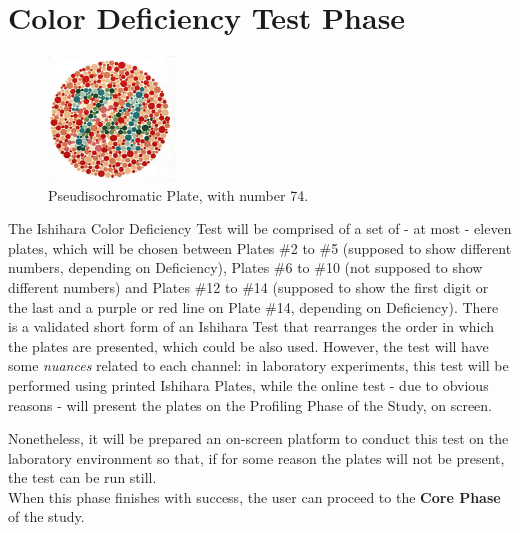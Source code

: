 \documentclass{report}
\begin{document}
\section{Color Deficiency Test Phase}
\label{ishihara}
\begin{figure}
	\centering
    \vspace{-\baselineskip}
    \includegraphics[width=0.3\textwidth]{IshiharaPlates.jpg}
    \caption[Color Deficiency Test Phase of First Study]{Pseudisochromatic Plate, with number 74.\protect\footnotemark{}}
\end{figure}
%
The Ishihara Color Deficiency Test will be comprised of a set of - at most - eleven plates, which will be chosen between Plates \#2 to \#5 (supposed to
show different numbers, depending on Deficiency), Plates \#6 to \#10 (not supposed to show different numbers) and Plates \#12 to \#14 (supposed to
show the first digit or the last and a purple or red line on Plate \#14, depending on Deficiency). There is a validated \cite{Alwis1992} short form of an Ishihara Test that rearranges the order in which the plates are presented, which could be also used. However, the test will have some \emph{nuances} related
to each channel: in laboratory experiments, this test will be performed using printed Ishihara Plates, while the online test - due to obvious reasons -
will present the plates on the Profiling Phase of the Study, on screen. \par
Nonetheless, it will be prepared an on-screen platform to conduct this test on the laboratory environment so that, if for some reason the plates will not
be present, the test can be run still. \\
When this phase finishes with success, the user can proceed to the \textbf{Core Phase} of the study. 
%
\end{document}
